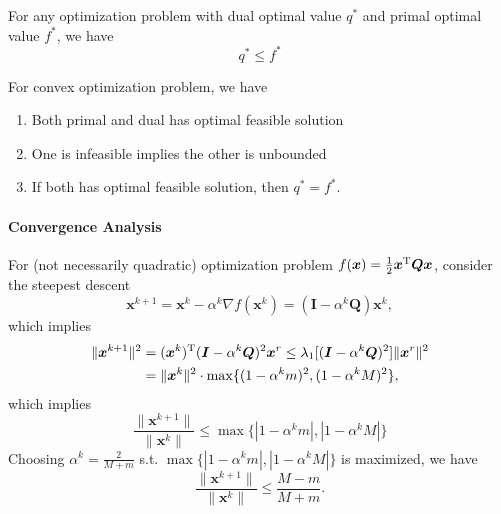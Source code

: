 \begin{theorem}
For any optimization problem with dual optimal value $q^*$ and primal optimal value $f^*$, we have
\[
q^*\le f^*
\]
\end{theorem}
\begin{theorem}
For convex optimization problem, we have
\begin{enumerate}
\item
Both primal and dual has optimal feasible solution
\item
One is infeasible implies the other is unbounded
\item
If both has optimal feasible solution, then $q^*=f^*$.
\end{enumerate}
\end{theorem}
\paragraph{Convergence Analysis}
For (not necessarily quadratic) optimization problem $f(\bm x)=\frac{1}{2}\bm x^{\mathrm T}\bm Q\bm x$, consider the steepest descent
\[
\bm x^{k+1}=\bm x^k-\alpha^k\nabla f(\bm x^k)=(\bm I-\alpha^k\bm Q)\bm x^k,
\]
which implies
\begin{align*}
\|\bm x^{k+1}\|^2&=(\bm x^k)^{\mathrm T} (\bm I-\alpha^k\bm Q)^2\bm x^r\le \lambda_1[(\bm I-\alpha^k\bm Q)^2]\|\bm x^{r}\|^2\\
&=\|\bm x^{k}\|^2\cdot\max\{(1-\alpha^km)^2,(1-\alpha^kM)^2\},
\end{align*}
which implies
\[
\frac{\|\bm x^{k+1}\|}{\|\bm x^k\|}\le\max\{|1-\alpha^km|,|1-\alpha^kM|\}
\]
Choosing $\alpha^k=\frac{2}{M+m}$ s.t. $\max\{|1-\alpha^km|,|1-\alpha^kM|\}$ is maximized, we have
\[
\frac{\|\bm x^{k+1}\|}{\|\bm x^k\|}\le\frac{M-m}{M+m}.
\]
































